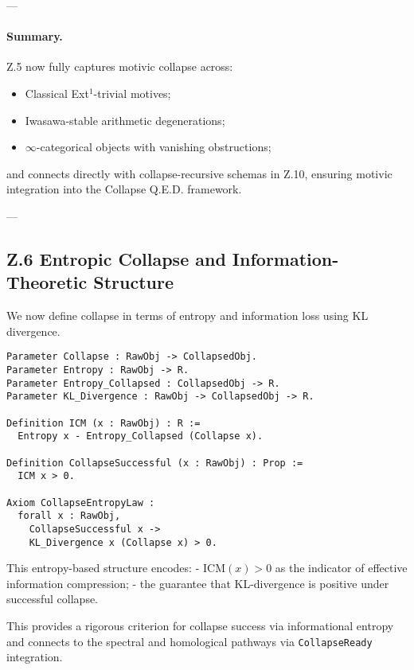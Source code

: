 \documentclass[11pt]{article}
\begin{document}
---

\paragraph{Summary.}
Z.5 now fully captures motivic collapse across:
\begin{itemize}
  \item Classical Ext$^1$-trivial motives;
  \item Iwasawa-stable arithmetic degenerations;
  \item $\infty$-categorical objects with vanishing obstructions;
\end{itemize}
and connects directly with collapse-recursive schemas in Z.10, ensuring motivic integration into the Collapse Q.E.D. framework.


---

\subsection*{Z.6 Entropic Collapse and Information-Theoretic Structure}

We now define collapse in terms of entropy and information loss using KL divergence.

\begin{lstlisting}[language=Coq]
Parameter Collapse : RawObj -> CollapsedObj.
Parameter Entropy : RawObj -> R.
Parameter Entropy_Collapsed : CollapsedObj -> R.
Parameter KL_Divergence : RawObj -> CollapsedObj -> R.

Definition ICM (x : RawObj) : R :=
  Entropy x - Entropy_Collapsed (Collapse x).

Definition CollapseSuccessful (x : RawObj) : Prop :=
  ICM x > 0.

Axiom CollapseEntropyLaw :
  forall x : RawObj,
    CollapseSuccessful x ->
    KL_Divergence x (Collapse x) > 0.
\end{lstlisting}

This entropy-based structure encodes:
- \( \mathrm{ICM}(x) > 0 \) as the indicator of effective information compression;
- the guarantee that KL-divergence is positive under successful collapse.

This provides a rigorous criterion for collapse success via informational entropy and connects to the spectral and homological pathways via \texttt{CollapseReady} integration.
\end{document}
